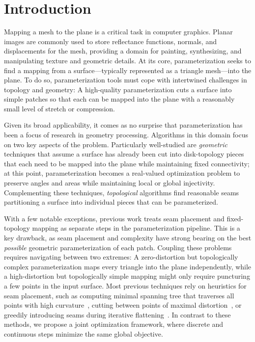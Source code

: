 
\section{Introduction}
Mapping a mesh to the plane is a critical task in computer graphics.  Planar images are commonly used to store reflectance functions, normals, and displacements
for the mesh, providing a domain for painting, synthesizing, and manipulating texture and geometric details.
At its core, parameterization seeks to find a mapping from a surface---typically represented as a triangle mesh---into the plane.  To do so, parameterization tools must cope with intertwined challenges in topology and geometry:  A high-quality parameterization cuts a surface into simple %
patches so that each can be mapped into the plane with a reasonably small level of stretch or compression.

Given its broad applicability, it comes as no surprise that parameterization has been a focus of research in geometry processing.  Algorithms in this domain focus on two key aspects of the problem.  Particularly well-studied are \emph{geometric} techniques that assume a surface has already been cut into disk-topology pieces that each need to be mapped into the plane while maintaining fixed connectivity; at this point, parameterization becomes a real-valued optimization problem to preserve angles and areas while maintaining local or global injectivity. Complementing these techniques, \emph{topological} algorithms find reasonable seams partitioning a surface into individual pieces that can be parameterized.  

With a few notable exceptions, previous work treats seam placement and fixed-topology mapping as separate steps in the parameterization pipeline.  This is a key drawback, as seam placement and complexity have strong bearing on the best \emph{possible} geometric parameterization of each patch.  Coupling these problems requires navigating between two extremes:  A zero-distortion but topologically complex parameterization maps every triangle into the plane independently, while a high-distortion but topologically simple mapping might only require puncturing a few points in the input surface.
%
%
Most previous techniques rely on heuristics for seam placement, such as computing minimal spanning tree that traverses all points with high curvature~\cite{Sheffer2002Seamster}, cutting between points of maximal distortion~\cite{Gu2002Geometry}, or greedily introducing seams during iterative flattening~\cite{BoundedDistortParam:2002}. In contrast to these methods, we propose a joint optimization framework, where discrete and continuous steps minimize the same global objective. 


